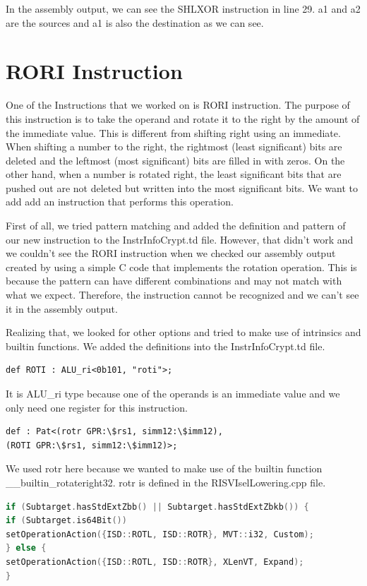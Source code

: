In the assembly output, we can see the SHLXOR instruction in line 29. a1 and a2 are the sources and a1 is also the destination as we can see.

\section{RORI Instruction}
One of the Instructions that we worked on is RORI instruction. The purpose of this instruction is to take the operand and rotate it to the right by the amount of the immediate value. This is different from shifting right using an immediate. When shifting a number to the right, the rightmost (least significant) bits are deleted and the leftmost (most significant) bits are filled in with zeros. On the other hand, when a number is rotated right, the least significant bits that are pushed out are not deleted but written into the most significant bits. We want to add add an instruction that performs this operation.

First of all, we tried pattern matching and added the definition and pattern of our new instruction to the InstrInfoCrypt.td file. However, that didn’t work and we couldn’t see the RORI instruction when we checked our assembly output created by using a simple C code that implements the rotation operation. This is because the pattern can have different combinations and may not match with what we expect. Therefore, the instruction cannot be recognized and we can’t see it in the assembly output.

Realizing that, we looked for other options and tried to make use of intrinsics and builtin functions. We added the definitions into the InstrInfoCrypt.td file.

\begin{lstlisting}
def ROTI : ALU_ri<0b101, "roti">;
\end{lstlisting}

It is ALU\_ri type because one of the operands is an immediate value and we only need one register for this instruction.

\begin{lstlisting}
def : Pat<(rotr GPR:\$rs1, simm12:\$imm12),
(ROTI GPR:\$rs1, simm12:\$imm12)>;
\end{lstlisting}

We used rotr here because we wanted to make use of the builtin function \_\_builtin\_rotateright32. rotr is defined in the RISVIselLowering.cpp file.

\begin{lstlisting}[language=C++]
if (Subtarget.hasStdExtZbb() || Subtarget.hasStdExtZbkb()) {
if (Subtarget.is64Bit())
setOperationAction({ISD::ROTL, ISD::ROTR}, MVT::i32, Custom);
} else {
setOperationAction({ISD::ROTL, ISD::ROTR}, XLenVT, Expand); 
}
\end{lstlisting}

